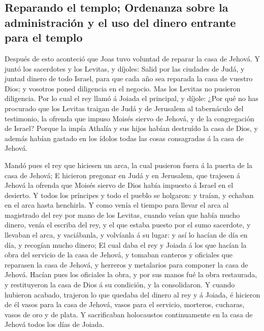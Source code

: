 \hypertarget{reparando-el-templo-ordenanza-sobre-la-administraciuxf3n-y-el-uso-del-dinero-entrante-para-el-templo}{%
\subsection{Reparando el templo; Ordenanza sobre la administración y el
uso del dinero entrante para el
templo}\label{reparando-el-templo-ordenanza-sobre-la-administraciuxf3n-y-el-uso-del-dinero-entrante-para-el-templo}}

 Después de esto aconteció que Joas tuvo voluntad de reparar
la casa de Jehová.  Y juntó los sacerdotes y los Levitas, y
díjoles: Salid por las ciudades de Judá, y juntad dinero de todo Israel,
para que cada año sea reparada la casa de vuestro Dios; y vosotros poned
diligencia en el negocio. Mas los Levitas no pusieron diligencia.
 Por lo cual el rey llamó á Joiada el principal, y díjole:
¿Por qué no has procurado que los Levitas traigan de Judá y de Jerusalem
al tabernáculo del testimonio, la ofrenda que impuso Moisés siervo de
Jehová, y de la congregación de Israel?  Porque la impía
Athalía y sus hijos habían destruído la casa de Dios, y además habían
gastado en los ídolos todas las cosas consagradas á la casa de Jehová.

 Mandó pues el rey que hiciesen un arca, la cual pusieron
fuera á la puerta de la casa de Jehová;  E hicieron pregonar
en Judá y en Jerusalem, que trajesen á Jehová la ofrenda que Moisés
siervo de Dios había impuesto á Israel en el desierto.  Y
todos los príncipes y todo el pueblo se holgaron: y traían, y echaban en
el arca hasta henchirla.  Y como venía el tiempo para
llevar el arca al magistrado del rey por mano de los Levitas, cuando
veían que había mucho dinero, venía el escriba del rey, y el que estaba
puesto por el sumo sacerdote, y llevaban el arca, y vaciábanla, y
volvíanla á su lugar: y así lo hacían de día en día, y recogían mucho
dinero;  El cual daba el rey y Joiada á los que hacían la
obra del servicio de la casa de Jehová, y tomaban canteros y oficiales
que reparasen la casa de Jehová, y herreros y metalarios para componer
la casa de Jehová.  Hacían pues los oficiales la obra, y
por sus manos fué la obra restaurada, y restituyeron la casa de Dios á
su condición, y la consolidaron.  Y cuando hubieron
acabado, trajeron lo que quedaba del dinero al rey y á Joiada, é
hicieron de él vasos para la casa de Jehová, vasos para el servicio,
morteros, cucharas, vasos de oro y de plata. Y sacrificaban holocaustos
continuamente en la casa de Jehová todos los días de Joiada.

